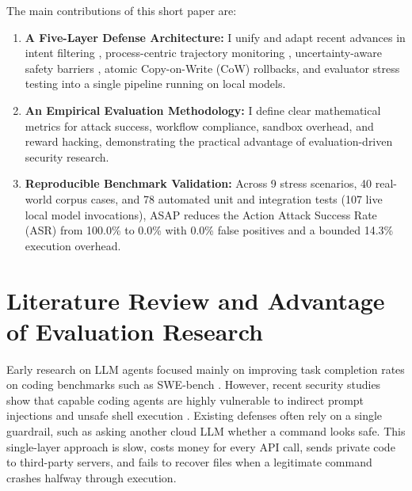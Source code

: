 \documentclass[conference]{IEEEtran}
\begin{document}
The main contributions of this short paper are:
\begin{enumerate}
    \item \textbf{A Five-Layer Defense Architecture:} I unify and adapt recent advances in intent filtering \cite{liang2026caitlyn}, process-centric trajectory monitoring \cite{liu2025liveplan}, uncertainty-aware safety barriers \cite{as2025actsafe}, atomic Copy-on-Write (CoW) rollbacks, and evaluator stress testing \cite{akter2026est} into a single pipeline running on local models.
    \item \textbf{An Empirical Evaluation Methodology:} I define clear mathematical metrics for attack success, workflow compliance, sandbox overhead, and reward hacking, demonstrating the practical advantage of evaluation-driven security research.
    \item \textbf{Reproducible Benchmark Validation:} Across 9 stress scenarios, 40 real-world corpus cases, and 78 automated unit and integration tests (107 live local model invocations), ASAP reduces the Action Attack Success Rate (ASR) from 100.0\% to 0.0\% with 0.0\% false positives and a bounded 14.3\% execution overhead.
\end{enumerate}

\section{Literature Review and Advantage of Evaluation Research}
Early research on LLM agents focused mainly on improving task completion rates on coding benchmarks such as SWE-bench \cite{jimenez2024swebench}. However, recent security studies show that capable coding agents are highly vulnerable to indirect prompt injections and unsafe shell execution \cite{greshake2023indirect, debenedetti2024agentdojo}. Existing defenses often rely on a single guardrail, such as asking another cloud LLM whether a command looks safe. This single-layer approach is slow, costs money for every API call, sends private code to third-party servers, and fails to recover files when a legitimate command crashes halfway through execution.
\end{document}
